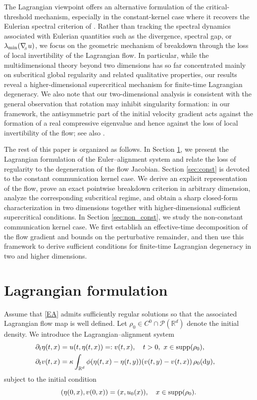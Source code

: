 \documentclass[11pt]{amsart}
\numberwithin{equation}{section}
\theoremstyle{definition}
\theoremstyle{remark}
\numberwithin{equation}{section}
\newcommand{\R}{\mathbb R}
\newcommand{\pa}{\partial}
\newcommand{\intr}{\int_{\R^d}}
\newcommand{\calP}{\mathcal P}
\newcommand{\dy}{\textnormal{d}y}
\newcommand{\supp}{{\rm supp}}
\newcommand{\nabS}{\nabla_{\!\!{}_S}}
\newcommand{\lamin}{\lambda_{\textnormal{min}}}
\begin{document}
The Lagrangian viewpoint offers an alternative formulation of the critical-threshold mechanism, especially in the constant-kernel case where it recovers the Eulerian spectral criterion of \cite{LT02}. Rather than tracking the spectral dynamics associated with Eulerian quantities such as the divergence, spectral gap, or $\lamin(\nabS u)$, we focus on the geometric mechanism of breakdown through the loss of local invertibility of the Lagrangian flow. In particular, while the multidimensional theory beyond two dimensions has so far concentrated mainly on subcritical global regularity and related qualitative properties, our results reveal a higher-dimensional supercritical mechanism for finite-time Lagrangian degeneracy. We also note that our two-dimensional analysis is consistent with the general observation that rotation may inhibit singularity formation: in our framework, the antisymmetric part of the initial velocity gradient acts against the formation of a real compressive eigenvalue and hence against the loss of local invertibility of the flow; see also \cite{HT17,LT04}.

The rest of this paper is organized as follows. In Section \ref{sec:Lag}, we present the Lagrangian formulation of the Euler--alignment system and relate the loss of regularity to the degeneration of the flow Jacobian. Section \ref{sec:const} is devoted to the constant communication kernel case. We derive an explicit representation of the flow, prove an exact pointwise breakdown criterion in arbitrary dimension, analyze the corresponding subcritical regime, and obtain a sharp closed-form characterization in two dimensions together with higher-dimensional sufficient supercritical conditions. In Section \ref{sec:non_const}, we study the non-constant communication kernel case. We first establish an effective-time decomposition of the flow gradient and bounds on the perturbative remainder, and then use this framework to derive sufficient conditions for finite-time Lagrangian degeneracy in two and higher dimensions.
 
%
%
%                   
%
%
 \section{Lagrangian formulation}\label{sec:Lag}
Assume that \eqref{EA} admits sufficiently regular solutions so that the associated Lagrangian flow map is well defined. Let $\rho_0\in C^0\cap\calP(\R^d)$ denote the initial density. We introduce the Lagrangian--alignment system
\begin{align}\label{LA}
\begin{aligned}
&\pa_t \eta(t,x) = u(t,\eta(t,x)) =: v(t,x), \quad t>0, \ x \in \supp(\rho_0), \cr
&\pa_t v(t,x)  = \kappa  \intr \phi(\eta(t,x)-\eta(t,y)) (v(t,y) - v(t,x))\,\rho_0(\dy),
\end{aligned}
\end{align}
subject to the initial condition
\[
(\eta(0,x), v(0,x)) = (x, u_0(x)), \quad x \in \supp(\rho_0).
\]
\end{document}
